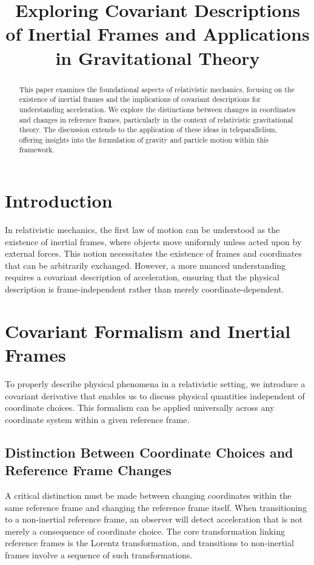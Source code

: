 \documentclass[12pt]{article}
\title{Exploring Covariant Descriptions of Inertial Frames and Applications in Gravitational Theory}
\author{}
\date{}
\begin{document}
\maketitle

\begin{abstract}
This paper examines the foundational aspects of relativistic mechanics, focusing on the existence of inertial frames and the implications of covariant descriptions for understanding acceleration. We explore the distinctions between changes in coordinates and changes in reference frames, particularly in the context of relativistic gravitational theory. The discussion extends to the application of these ideas in teleparallelism, offering insights into the formulation of gravity and particle motion within this framework.
\end{abstract}

\section{Introduction}
In relativistic mechanics, the first law of motion can be understood as the existence of inertial frames, where objects move uniformly unless acted upon by external forces. This notion necessitates the existence of frames and coordinates that can be arbitrarily exchanged. However, a more nuanced understanding requires a covariant description of acceleration, ensuring that the physical description is frame-independent rather than merely coordinate-dependent.

\section{Covariant Formalism and Inertial Frames}
To properly describe physical phenomena in a relativistic setting, we introduce a covariant derivative that enables us to discuss physical quantities independent of coordinate choices. This formalism can be applied universally across any coordinate system within a given reference frame.

\subsection{Distinction Between Coordinate Choices and Reference Frame Changes}
A critical distinction must be made between changing coordinates within the same reference frame and changing the reference frame itself. When transitioning to a non-inertial reference frame, an observer will detect acceleration that is not merely a consequence of coordinate choice. The core transformation linking reference frames is the Lorentz transformation, and transitions to non-inertial frames involve a sequence of such transformations.
\end{document}
